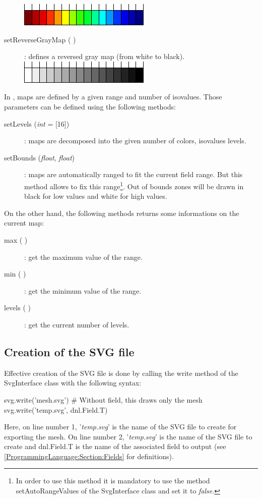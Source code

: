 \begin{description}
 \hspace*{0.2\columnwidth}\includegraphics{Figures/ProgrammingLanguage/ReverseDeepColorMap}
\item [{setReverseGrayMap ( )}] : defines a reversed gray map (from white to black).\\
 \hspace*{0.2\columnwidth}\includegraphics{Figures/ProgrammingLanguage/ReverseGrayMap}
\end{description}

In \DynELA, maps are defined by a given range and number of isovalues. Those parameters can be defined using the following methods:
\begin{description}
\item [{setLevels (\emph{int} = [16]})] : maps are decomposed into the given number of colors, \ie isovalues levels.
\item [{setBounds (\emph{float}, \emph{float})}] : maps are automatically ranged to fit the current field range. But this method allows to fix this range\footnote{In order to use this method it is mandatory to use the method \textsf{setAutoRangeValues} of the \textsf{SvgInterface} class and set it to \emph{false}.}. Out of bounds zones will be drawn in black for low values and white for high values.
\end{description}

On the other hand, the following methods returns some informations on the current map:
\begin{description}
\item [{max ( )}] : get the maximum value of the range.
\item [{min ( )}] : get the minimum value of the range.
\item [{levels ( )}] : get the current number of levels.
\end{description}

\subsection{Creation of the SVG file}
Effective creation of the SVG file is done by calling the \textsf{write} method of the \textsf{SvgInterface} class with the following syntax:
\begin{PythonListing}
svg.write('mesh.svg') # Without field, this draws only the mesh
svg.write('temp.svg', dnl.Field.T)
\end{PythonListing}
Here, on line number 1, '\emph{temp.svg}' is the name of the SVG file to create for exporting the mesh. On line number 2, '\emph{temp.svg}' is the name of the SVG file to create and \textsf{dnl.Field.T} is the name of the associated field to output (see \ref{ProgrammingLanguage:Section:Fields} for definitions).
